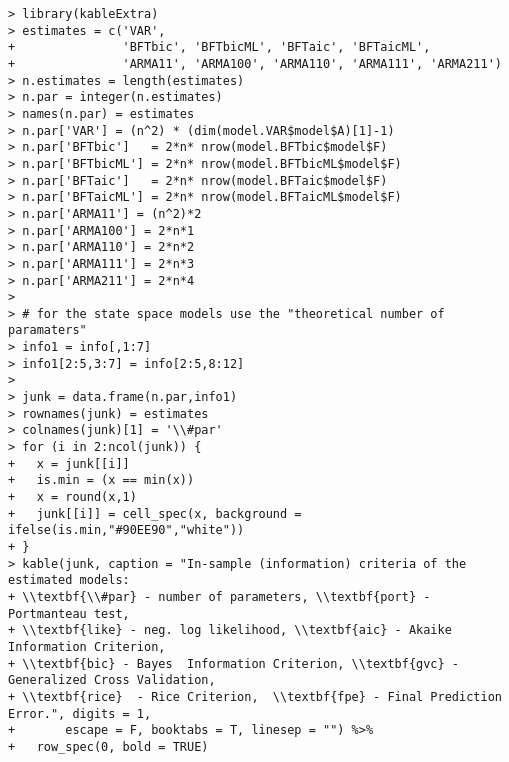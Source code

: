 \documentclass[]{article}
\begin{document}
\begin{verbatim}
> library(kableExtra)
> estimates = c('VAR',
+               'BFTbic', 'BFTbicML', 'BFTaic', 'BFTaicML',
+               'ARMA11', 'ARMA100', 'ARMA110', 'ARMA111', 'ARMA211')
> n.estimates = length(estimates)
> n.par = integer(n.estimates)
> names(n.par) = estimates
> n.par['VAR'] = (n^2) * (dim(model.VAR$model$A)[1]-1)
> n.par['BFTbic']   = 2*n* nrow(model.BFTbic$model$F)
> n.par['BFTbicML'] = 2*n* nrow(model.BFTbicML$model$F)
> n.par['BFTaic']   = 2*n* nrow(model.BFTaic$model$F)
> n.par['BFTaicML'] = 2*n* nrow(model.BFTaicML$model$F)
> n.par['ARMA11'] = (n^2)*2
> n.par['ARMA100'] = 2*n*1
> n.par['ARMA110'] = 2*n*2
> n.par['ARMA111'] = 2*n*3
> n.par['ARMA211'] = 2*n*4
> 
> # for the state space models use the "theoretical number of paramaters"
> info1 = info[,1:7]
> info1[2:5,3:7] = info[2:5,8:12]
> 
> junk = data.frame(n.par,info1)
> rownames(junk) = estimates
> colnames(junk)[1] = '\\#par'
> for (i in 2:ncol(junk)) {
+   x = junk[[i]]
+   is.min = (x == min(x))
+   x = round(x,1)
+   junk[[i]] = cell_spec(x, background = ifelse(is.min,"#90EE90","white"))
+ }
> kable(junk, caption = "In-sample (information) criteria of the estimated models: 
+ \\textbf{\\#par} - number of parameters, \\textbf{port} - Portmanteau test, 
+ \\textbf{like} - neg. log likelihood, \\textbf{aic} - Akaike Information Criterion,
+ \\textbf{bic} - Bayes  Information Criterion, \\textbf{gvc} - Generalized Cross Validation,
+ \\textbf{rice}  - Rice Criterion,  \\textbf{fpe} - Final Prediction Error.", digits = 1, 
+       escape = F, booktabs = T, linesep = "") %>% 
+   row_spec(0, bold = TRUE)
\end{verbatim}
\end{document}
